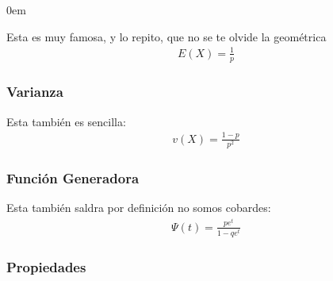 \documentclass[12pt, fleqn]{report}                             %
\newenvironment{SmallIndentation}[1][0.75em]                    %
        {\begin{adjustwidth}{#1}{}\begin{footnotesize}}             %
        {\end{footnotesize}\end{adjustwidth}}                       %
\theoremstyle{break}                                            %
\begin{document}
\begin{multicols}{2}
\begin{SmallIndentation}[0em]
                        Esta es muy famosa, y lo repito, que no se te olvide la geométrica
                        \begin{align*}
                            E(X) = \frac{1}{p}
                        \end{align*}

                    \subsubsection{Varianza}

                        Esta también es sencilla:
                        \begin{align*}
                            v(X) = \frac{1-p}{p^2}
                        \end{align*}

                         
                    \subsubsection{Función Generadora}   

                        Esta también saldra por definición no somos cobardes:
                        \begin{align*}
                            \Psi (t) = \frac{pe^t}{1-qe^t}  
                        \end{align*}


                    \subsubsection{Propiedades}

                        \begin{itemize}
                            

\end{itemize}
\end{SmallIndentation}
\end{multicols}
\end{document}
